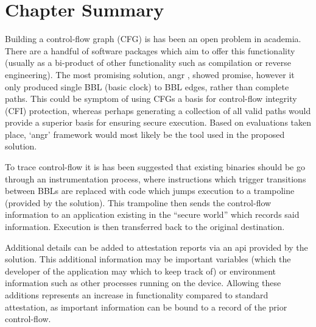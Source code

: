 \section{Chapter Summary}
Building a control-flow graph (CFG) is has been an open problem in academia. There are a handful of software packages which aim to offer this functionality (usually as a bi-product of other functionality such as compilation or reverse engineering). The most promising solution, angr \cite{Shoshitaishvili2016}, showed promise, however it only produced single BBL (basic clock) to BBL edges, rather than complete paths. This could be symptom of using CFGs a basis for control-flow integrity (CFI) protection, whereas perhaps generating a collection of all valid paths would provide a superior basis for ensuring secure execution. Based on evaluations taken place, `angr' framework would most likely be the tool used in the proposed solution.

To trace control-flow it is has been suggested that existing binaries should be go through an instrumentation process, where instructions which trigger transitions between BBLs are replaced with code which jumps execution to a trampoline (provided by the solution). This trampoline then sends the control-flow information to an application existing in the ``secure world'' which records said information. Execution is then transferred back to the original destination.

Additional details can be added to attestation reports via an api provided by the solution. This additional information may be important variables (which the developer of the application may which to keep track of) or environment information such as other processes running on the device. Allowing these additions represents an increase in functionality compared to standard attestation, as important information can be bound to a record of the prior control-flow.